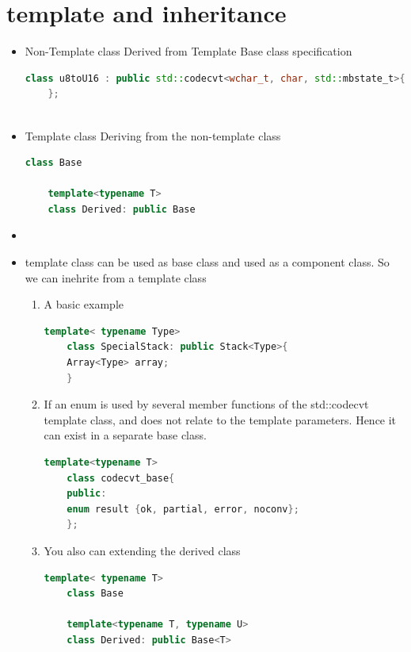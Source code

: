 \documentclass[a4paper,12pt,twoside]{book}
\begin{document}
\section{template and inheritance}

\begin{itemize}
	
	\item Non-Template class Derived from Template Base class specification

	\begin{lstlisting}[frame=single, language=c++]
	class u8toU16 : public std::codecvt<wchar_t, char, std::mbstate_t>{
	};
	
	\end{lstlisting}

	
	\item Template class Deriving from the non-template class
	\begin{lstlisting}[frame=single, language=c++]
	class Base
	
	template<typename T>
	class Derived: public Base
	\end{lstlisting}	
	
	\item \item template class can be used as base class and used as a component class. So we can inehrite from a template class
\begin{enumerate}
	\item A basic example
	\begin{lstlisting}[frame=single, language=c++]
	template< typename Type>
	class SpecialStack: public Stack<Type>{
	Array<Type> array;
	}
	\end{lstlisting}	
	
	\item If an enum is used by several member functions of the std::codecvt template class, and does not relate to the template parameters. Hence it can exist in a separate base class.
	
	\begin{lstlisting}[frame=single, language=c++]
	template<typename T>
	class codecvt_base{
	public:
	enum result {ok, partial, error, noconv};
	};
	\end{lstlisting}
	
	\item You also can extending the derived class
	\begin{lstlisting}[frame=single, language=c++]
	template< typename T>
	class Base
	
	template<typename T, typename U>
	class Derived: public Base<T>
	\end{lstlisting}
	

\end{enumerate}
\end{itemize}
\end{document}
